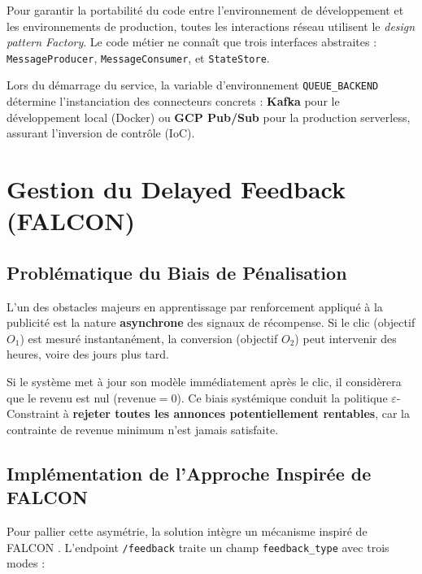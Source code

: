 Pour garantir la portabilité du code entre l'environnement de développement et les environnements de production, toutes les interactions réseau utilisent le \textit{design pattern Factory}. Le code métier ne connaît que trois interfaces abstraites : \texttt{MessageProducer}, \texttt{MessageConsumer}, et \texttt{StateStore}.

Lors du démarrage du service, la variable d'environnement \texttt{QUEUE\_BACKEND} détermine l'instanciation des connecteurs concrets : \textbf{Kafka} pour le développement local (Docker) ou \textbf{GCP Pub/Sub} pour la production serverless, assurant l'inversion de contrôle (IoC).


\section{Gestion du Delayed Feedback (FALCON)}
\label{sec:delayed_feedback}

\subsection{Problématique du Biais de Pénalisation}

L'un des obstacles majeurs en apprentissage par renforcement appliqué à la publicité est la nature \textbf{asynchrone} des signaux de récompense. Si le clic (objectif $O_1$) est mesuré instantanément, la conversion (objectif $O_2$) peut intervenir des heures, voire des jours plus tard.

Si le système met à jour son modèle immédiatement après le clic, il considèrera que le revenu est nul ($\text{revenue} = 0$). Ce biais systémique conduit la politique $\varepsilon$-Constraint à \textbf{rejeter toutes les annonces potentiellement rentables}, car la contrainte de revenue minimum n'est jamais satisfaite.

\subsection{Implémentation de l'Approche Inspirée de FALCON}

Pour pallier cette asymétrie, la solution intègre un mécanisme inspiré de FALCON \parencite{ktena2019addressing}. L'endpoint \texttt{/feedback} traite un champ \texttt{feedback\_type} avec trois modes :

